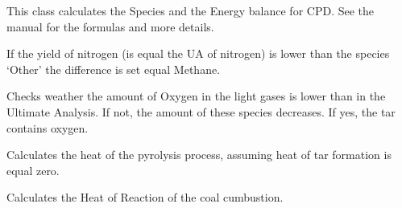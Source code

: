 \documentclass[letterpaper,10pt,english]{sphinxmanual}
\begin{document}
\begin{fulllineitems}
\label{CPDClasses:Compos_and_Energy.CPD_SpeciesBalance}
This class calculates the Species and the Energy balance for CPD. See the manual for the formulas and more details.

\begin{fulllineitems}
\label{CPDClasses:Compos_and_Energy.CPD_SpeciesBalance._CPD_SpeciesBalance__CheckOthers}
If the yield of nitrogen (is equal the UA of nitrogen) is lower than the species `Other' the difference is set equal Methane.

\end{fulllineitems}


\begin{fulllineitems}
\label{CPDClasses:Compos_and_Energy.CPD_SpeciesBalance._CPD_SpeciesBalance__CheckOxygen}
Checks weather the amount of Oxygen in the light gases is lower than in the Ultimate Analysis. If not, the amount of these species decreases. If yes, the tar contains oxygen.

\end{fulllineitems}


\begin{fulllineitems}
\label{CPDClasses:Compos_and_Energy.CPD_SpeciesBalance._CPD_SpeciesBalance__QPyro}
Calculates the heat of the pyrolysis process, assuming heat of tar formation is equal zero.

\end{fulllineitems}


\begin{fulllineitems}
\label{CPDClasses:Compos_and_Energy.CPD_SpeciesBalance._CPD_SpeciesBalance__Q_React}
Calculates the Heat of Reaction of the coal cumbustion.


\end{fulllineitems}
\end{fulllineitems}
\end{document}
